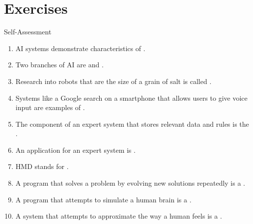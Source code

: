 \documentclass[\main/notes.tex]{subfiles}
\begin{document}
		\section{Exercises}
			\begin{exercise}{Self-Assessment}
				\begin{enumerate}[nosep]
					\item AI systems demonstrate characteristics of .
					\item Two branches of AI are  and .
					\item Research into robots that are the size of a grain of salt is called .
					\item Systems like a Google search on a smartphone that allows users to give voice input are examples of .
					\item The component of an expert system that stores relevant data and rules is the .
					\item An application for an expert system is .
					\item HMD stands for .
					\item A program that solves a problem by evolving new solutions repeatedly is a .
					\item A program that attempts to simulate a human brain is a .
					\item A system that attempts to approximate the way a human feels is a .
				\end{enumerate}
			\end{exercise}

	\vbox{}
\end{document}
